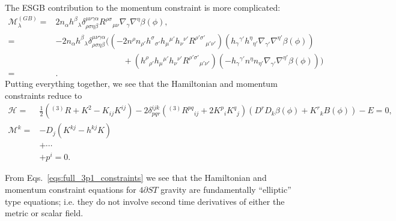 \documentclass[%
notitlepage,
report,
nofootinbib,
 amsmath,amssymb,
 aps,
]{revtex4-1}
\begin{document}
The ESGB contribution to the momentum constraint is more complicated:
\begin{align}
   \label{eq:momentum_constraint_3p1}
   \mathcal{M}^{(GB)}_{\lambda}
   =&
   2n_{\alpha}h^{\beta}{}_{\lambda}
   \delta^{\mu\nu\gamma\alpha}_{\rho\sigma\eta\beta}
   R^{\rho\sigma}{}_{\mu\nu}
   \nabla_{\gamma}\nabla^{\eta}\beta\left(\phi\right)
   ,\\
   =&
   -
   2n_{\alpha}h^{\beta}{}_{\lambda}
   \delta^{\mu\nu\gamma\alpha}_{\rho\sigma\eta\beta}
   \Big(
      \left(
         -
         2n^{\rho}n_{\rho'}h^{\sigma}{}_{\sigma'}
         h_{\mu}{}^{\mu'}h_{\nu}{}^{\nu'}
         R^{\rho'\sigma'}{}_{\mu'\nu'}
      \right)
      \left(
         h_{\gamma}{}^{\gamma'}h^{\eta}{}_{\eta'}
         \nabla_{\gamma'}\nabla^{\eta'}\beta\left(\phi\right)
      \right)
      \nonumber\\&\qquad\qquad\qquad\qquad
      +
      \left(
         h^{\rho}{}_{\rho'}h_{\mu}{}^{\mu'}h_{\nu}{}^{\nu'}
         R^{\rho'\sigma'}{}_{\mu'\nu'}
      \right)
      \left(
         -h_{\gamma}{}^{\gamma'}n^{\eta}n_{\eta'}
         \nabla_{\gamma'}\nabla^{\eta'}\beta\left(\phi\right)
      \right)
   \Big)
   \nonumber\\
   =&
   .
\end{align}
Putting everything together, we see that the Hamiltonian
and momentum constraints reduce to
\begin{subequations}
\label{eqs:full_3p1_constraints}
\begin{align}
   \mathcal{H}
   =&
   \frac{1}{2}\left(
      {}^{(3)}R
      +
      K^2
      -
      K_{ij}K^{ij}
   \right)
   -
   2\delta^{ijk}_{pqr}\left(
      {}^{(3)}R^{pq}{}_{ij}
      +
      2K^p{}_iK^q{}_j
   \right)
   \left(
      D^rD_k\beta\left(\phi\right)
      +
      K^r{}_kB\left(\phi\right)
   \right)
   -
   E
   =
   0
   ,\\
   \mathcal{M}^k
   =&
   -
   D_j\left(
      K^{kj}
      -
      h^{kj}K
   \right)
   \nonumber\\&
   +
   \cdots
   \nonumber\\&
   +
   p^i
   =
   0
   .
\end{align}
\end{subequations}

From Eqs.~\eqref{eqs:full_3p1_constraints}
we see that the Hamiltonian and momentum constraint
equations for $4\partial ST$ gravity
are fundamentally ``elliptic'' type equations; i.e.
they do not involve second time derivatives of either the metric
or scalar field.
\end{document}
